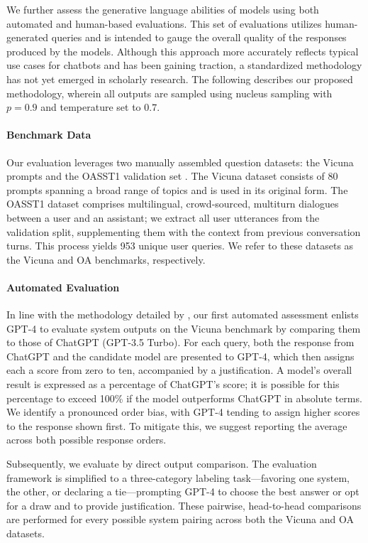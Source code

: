 We further assess the generative language abilities of models using both automated and human-based evaluations. This set of evaluations utilizes human-generated queries and is intended to gauge the overall quality of the responses produced by the models. Although this approach more accurately reflects typical use cases for chatbots and has been gaining traction, a standardized methodology has not yet emerged in scholarly research. The following describes our proposed methodology, wherein all outputs are sampled using nucleus sampling with $p=0.9$ and temperature set to $0.7$.

\paragraph{Benchmark Data} Our evaluation leverages two manually assembled question datasets: the Vicuna prompts \citep{vicuna2023} and the OASST1 validation set \citep{kopf2023openassistant}. The Vicuna dataset consists of 80 prompts spanning a broad range of topics and is used in its original form. The OASST1 dataset comprises multilingual, crowd-sourced, multiturn dialogues between a user and an assistant; we extract all user utterances from the validation split, supplementing them with the context from previous conversation turns. This process yields 953 unique user queries. We refer to these datasets as the Vicuna and OA benchmarks, respectively.

\paragraph{Automated Evaluation} In line with the methodology detailed by \citet{vicuna2023}, our first automated assessment enlists GPT-4 to evaluate system outputs on the Vicuna benchmark by comparing them to those of ChatGPT (GPT-3.5 Turbo). For each query, both the response from ChatGPT and the candidate model are presented to GPT-4, which then assigns each a score from zero to ten, accompanied by a justification. A model’s overall result is expressed as a percentage of ChatGPT’s score; it is possible for this percentage to exceed 100\% if the model outperforms ChatGPT in absolute terms. We identify a pronounced order bias, with GPT-4 tending to assign higher scores to the response shown first. To mitigate this, we suggest reporting the average across both possible response orders.

Subsequently, we evaluate by direct output comparison. The evaluation framework is simplified to a three-category labeling task—favoring one system, the other, or declaring a tie—prompting GPT-4 to choose the best answer or opt for a draw and to provide justification. These pairwise, head-to-head comparisons are performed for every possible system pairing across both the Vicuna and OA datasets.

